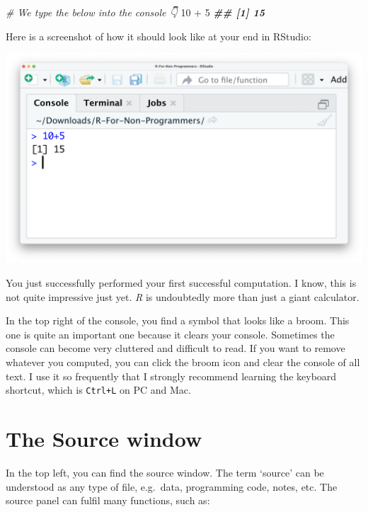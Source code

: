 \documentclass[
]{book}
\newenvironment{Shaded}{\begin{snugshade}}{\end{snugshade}}
\newcommand{\CommentTok}[1]{\textcolor[rgb]{0.56,0.35,0.01}{\textit{#1}}}
\newcommand{\DecValTok}[1]{\textcolor[rgb]{0.00,0.00,0.81}{#1}}
\newcommand{\DocumentationTok}[1]{\textcolor[rgb]{0.56,0.35,0.01}{\textbf{\textit{#1}}}}
\newcommand{\SpecialCharTok}[1]{\textcolor[rgb]{0.00,0.00,0.00}{#1}}
\begin{document}
\begin{Shaded}
\begin{Highlighting}[]
\CommentTok{\# We type the below into the console 👇}
\DecValTok{10} \SpecialCharTok{+} \DecValTok{5}
\DocumentationTok{\#\# [1] 15}
\end{Highlighting}
\end{Shaded}

Here is a screenshot of how it should look like at your end in RStudio:

\includegraphics{images/chapter_04_img/02_console_window/console_algebra.png}

You just successfully performed your first successful computation. I know, this is not quite impressive just yet. \emph{R} is undoubtedly more than just a giant calculator.

In the top right of the console, you find a symbol that looks like a broom. This one is quite an important one because it clears your console. Sometimes the console can become very cluttered and difficult to read. If you want to remove whatever you computed, you can click the broom icon and clear the console of all text. I use it so frequently that I strongly recommend learning the keyboard shortcut, which is \texttt{Ctrl+L} on PC and Mac.

\hypertarget{the-source-window}{%
\section{The Source window}\label{the-source-window}}

In the top left, you can find the source window. The term `source' can be understood as any type of file, e.g.~data, programming code, notes, etc. The source panel can fulfil many functions, such as:
\end{document}
